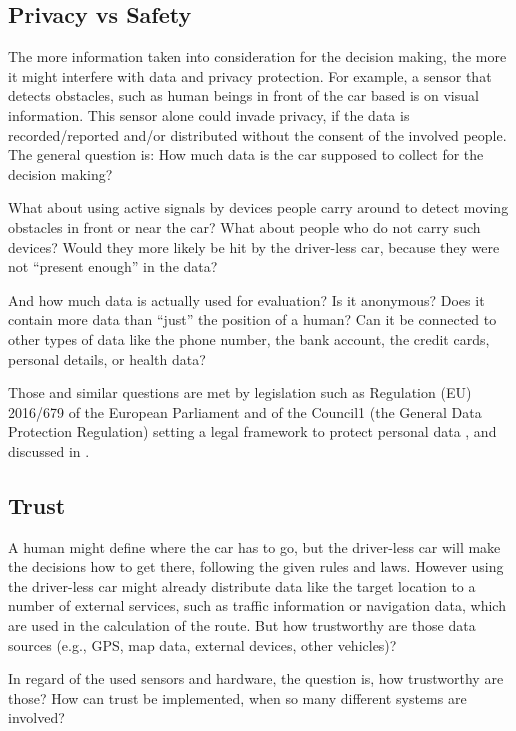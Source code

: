 \subsection{Privacy vs Safety}
\label{sec:EAofTC:PrivacyVSSafety}

The more information taken into consideration for the decision making, the more it might interfere with data and privacy protection. For example, a sensor that detects obstacles, such as human beings in front of the car based is on visual information. This sensor alone could invade privacy, if the data is recorded/reported and/or distributed without the consent of the involved people. The general question is: How much data is the car supposed to collect for the decision making?

What about using active signals by devices people carry around to detect moving obstacles in front or near the car? What about people who do not carry such devices? Would they more likely be hit by the driver-less car, because they were not \enquote{present enough} in the data?

And how much data is actually used for evaluation? Is it anonymous? Does it contain more data than \enquote{just} the position of a human? Can it be connected to other types of data like the phone number, the bank account, the credit cards, personal details, or health data?

Those and similar questions are met by legislation such as Regulation (EU) 2016/679 of the European Parliament and of the Council1 (the General Data Protection Regulation) setting a legal framework to protect personal data \cite{EuropeanUnion2016}, and discussed in \cite{doi:10.1093/idpl/ipx005}.


\subsection{Trust}
\label{sec:EAofTC:Trust}

A human might define where the car has to go, but the driver-less car will make the decisions how to get there, following the given rules and laws. However using the driver-less car might already distribute data like the target location to a number of external services, such as traffic information or navigation data, which are used in the calculation of the route. But how trustworthy are those data sources (e.g., GPS, map data, external devices, other vehicles)? 

In regard of the used sensors and hardware, the question is, how trustworthy are those? How can trust be implemented, when so many different systems are involved? 


